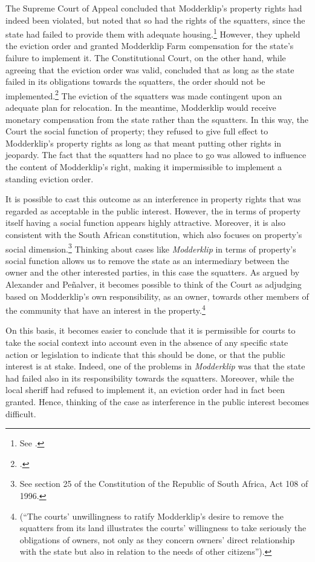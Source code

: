 The Supreme Court of Appeal concluded that Modderklip's property rights had indeed been violated, but noted that so had the rights of the squatters, since the state had failed to provide them with adequate housing.\footnote{See \cite{modderklip04}.} However, they upheld the eviction order and granted Modderklip Farm compensation for the state's failure to implement it. The Constitutional Court, on the other hand, while agreeing that the eviction order was valid, concluded that as long as the state failed in its obligations towards the squatters, the order should not be implemented.\footcite{modderklip05} The eviction of the squatters was made contingent upon an adequate plan for relocation. In the meantime, Modderklip would receive monetary compensation from the state rather than the squatters. In this way, the Court  the social function of property; they refused to give full effect to Modderklip's property rights as long as that meant putting other rights in jeopardy. The fact that the squatters had no place to go was allowed to influence the content of Modderklip's right, making it impermissible to implement a standing eviction order.

It is possible to cast this outcome as an interference in property rights that was regarded as acceptable in the public interest. However, the  in terms of property itself having a social function appears highly attractive. Moreover, it is also consistent with the South African constitution, which also focuses on property's social dimension.\footnote{See section 25 of the Constitution of the Republic of South Africa, Act 108 of 1996.} Thinking about cases like {\it Modderklip} in terms of property's social function allows us to remove the state as an intermediary between the owner and the other interested parties, in this case the squatters. As argued by Alexander and Pe\~{n}alver, it becomes possible to think of the Court as adjudging based on Modderklip's own responsibility, as an owner, towards other members of the community that have an interest in the property.\footnote{\cite[157]{alexander11} (``The courts' unwillingness to ratify Modderklip's desire to remove the squatters from its land illustrates the courts' willingness to take seriously the obligations of owners, not only as they concern owners' direct relationship with the state but also in relation to the needs of other citizens'').}

On this basis, it becomes easier to conclude that it is permissible for courts to take the social context into account even in the absence of any specific state action or legislation to indicate that this should be done, or that the public interest is at stake. Indeed, one of the problems in {\it Modderklip} was that the state had failed also in its responsibility towards the squatters. Moreover, while the local sheriff had refused to implement it, an eviction order had in fact been granted. Hence, thinking of the case as interference in the public interest becomes difficult.

